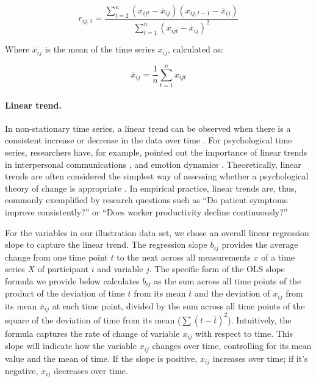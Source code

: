 \begin{equation} \label{eq:ar}
  r_{ij,1} = \frac{\sum_{t=2}^{n}(x_{ijt}-\overline{x}_{ij})(x_{ij,t-1}-\overline{x}_{ij})}{\sum_{t=1}^{n}(x_{ijt}-\overline{x}_{ij})^2}
\end{equation}

Where \(\overline{x}_{ij}\) is the mean of the time series \(x_{ij}\),
calculated as:

\begin{equation} \label{eq:mean_for_ar1}
  \overline{x}_{ij} = \frac{1}{n} \sum_{t=1}^{n} x_{ijt}
\end{equation}

\paragraph{Linear trend.}

In non-stationary time series, a linear trend can be observed when there
is a consistent increase or decrease in the data over time
\citep{nyblom1986}. For psychological time series, researchers have, for
example, pointed out the importance of linear trends in interpersonal
communications \citep{vasileiadou2014}, and emotion dynamics
\citep{oravecz2016}. Theoretically, linear trends are often considered
the simplest way of assessing whether a psychological theory of change
is appropriate \citep{gottman1969}. In empirical practice, linear trends
are, thus, commonly exemplified by research questions such as ``Do
patient symptoms improve consistently?'' or ``Does worker productivity
decline continuously?''

For the variables in our illustration data set, we chose an overall
linear regression slope to capture the linear trend. The regression
slope \(b_{ij}\) provides the average change from one time point \(t\)
to the next across all measurements \(x\) of a time series \(X\) of
participant \(i\) and variable \(j\). The specific form of the OLS slope
formula we provide below calculates \(b_{ij}\) as the sum across all
time points of the product of the deviation of time \(t\) from its mean
\(\overline{t}\) and the deviation of \(x_{ij}\) from its mean
\(\overline{x}_{ij}\) at each time point, divided by the sum across all
time points of the square of the deviation of time from its mean
(\(\sum(t-\overline{t})^2\)). Intuitively, the formula captures the rate
of change of variable \(x_{ij}\) with respect to time. This slope will
indicate how the variable \(x_{ij}\) changes over time, controlling for
its mean value and the mean of time. If the slope is positive,
\(x_{ij}\) increases over time; if it's negative, \(x_{ij}\) decreases
over time.

